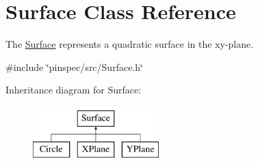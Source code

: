 \hypertarget{classSurface}{\section{Surface Class Reference}
\label{classSurface}
}


The \hyperlink{classSurface}{Surface} represents a quadratic surface in the xy-\/plane.  




{\ttfamily \#include \char`\"{}pinspec/src/\-Surface.\-h\char`\"{}}

Inheritance diagram for Surface\-:\begin{figure}[H]
\begin{center}
\leavevmode
\includegraphics[height=2.000000cm]{classSurface}
\end{center}
\end{figure}
